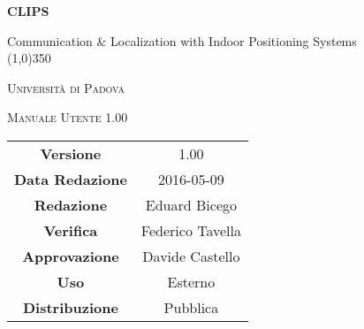 \documentclass[a4paper,12pt]{article}
\author{Eduard Bicego}
\date{01/05/2016}
\begin{document}
\begin{titlepage}
	\centering
	{\huge\bfseries CLIPS\par}
	Communication \& Localization with Indoor Positioning Systems \\
	\line(1,0){350} \\
	{\scshape\LARGE Università di Padova \par}
	\vspace{1cm}
	{\scshape\Large Manuale Utente 1.00 \par}
	\logo
	\newpage
	\begin{tabular}{c|c}
		{\hfill \textbf{Versione}} 			& 1.00					\\
		{\hfill\textbf{Data Redazione}} 		& 2016-05-09  		\\
		{\hfill\textbf{Redazione}} 			& Eduard Bicego			\\
		{\hfill\textbf{Verifica}} 				&  Federico Tavella					\\
		{\hfill\textbf{Approvazione}} 		& Davide Castello		\\
		{\hfill\textbf{Uso}} 					& Esterno			\\
		{\hfill\textbf{Distribuzione}} 			& Pubblica 		\\
	\end{tabular}
\end{titlepage}
	
	\newpage
	\pagestyle{myfront}
	
		\newpage
			
		\newpage
			\tableofcontents
		\newpage
			\listoffigures
	\label{LastFrontPage}

	\newpage
		\pagestyle{mymain}
	\newpage
		
	\newpage
		
	\newpage
		
	\newpage
		
	\newpage
		
	

		
	\label{LastPage}
\end{document}
